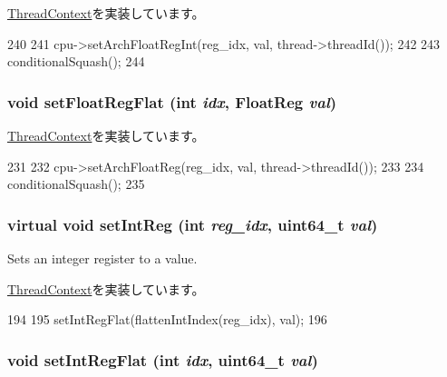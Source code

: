 \hyperlink{classThreadContext_a2964ca7e974bf80017ee30d832b32a35}{ThreadContext}を実装しています。


\begin{DoxyCode}
240 {
241     cpu->setArchFloatRegInt(reg_idx, val, thread->threadId());
242 
243     conditionalSquash();
244 }
\end{DoxyCode}
\hypertarget{classO3ThreadContext_a71ec23ca2c029120932e5af4babc0da1}{
\subsubsection[{setFloatRegFlat}]{\setlength{\rightskip}{0pt plus 5cm}void setFloatRegFlat (int {\em idx}, \/  {\bf FloatReg} {\em val})}}
\label{classO3ThreadContext_a71ec23ca2c029120932e5af4babc0da1}


\hyperlink{classThreadContext_a01392cdc362f9d589f90e57bcc519623}{ThreadContext}を実装しています。


\begin{DoxyCode}
231 {
232     cpu->setArchFloatReg(reg_idx, val, thread->threadId());
233 
234     conditionalSquash();
235 }
\end{DoxyCode}
\hypertarget{classO3ThreadContext_a8fef3127de63ab5e7f7414ea8137c2b1}{
\subsubsection[{setIntReg}]{\setlength{\rightskip}{0pt plus 5cm}virtual void setIntReg (int {\em reg\_\-idx}, \/  uint64\_\-t {\em val})}}
\label{classO3ThreadContext_a8fef3127de63ab5e7f7414ea8137c2b1}
Sets an integer register to a value. 

\hyperlink{classThreadContext_a995ac11ab79af59e135d473df10c72da}{ThreadContext}を実装しています。


\begin{DoxyCode}
194                                                       {
195         setIntRegFlat(flattenIntIndex(reg_idx), val);
196     }
\end{DoxyCode}
\hypertarget{classO3ThreadContext_ae3b8c9c2c1ae95767f0703357957a3f8}{
\subsubsection[{setIntRegFlat}]{\setlength{\rightskip}{0pt plus 5cm}void setIntRegFlat (int {\em idx}, \/  uint64\_\-t {\em val})}}
\label{classO3ThreadContext_ae3b8c9c2c1ae95767f0703357957a3f8}


